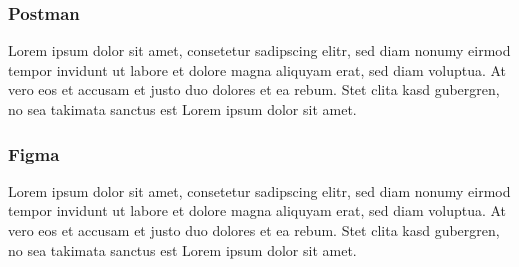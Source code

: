 \subsubsection{Postman}
Lorem ipsum dolor sit amet, consetetur sadipscing elitr, sed diam nonumy eirmod tempor invidunt ut labore et dolore magna aliquyam erat, sed diam voluptua. At vero eos et accusam et justo duo dolores et ea rebum. Stet clita kasd gubergren, no sea takimata sanctus est Lorem ipsum dolor sit amet.

\subsubsection{Figma}
Lorem ipsum dolor sit amet, consetetur sadipscing elitr, sed diam nonumy eirmod tempor invidunt ut labore et dolore magna aliquyam erat, sed diam voluptua. At vero eos et accusam et justo duo dolores et ea rebum. Stet clita kasd gubergren, no sea takimata sanctus est Lorem ipsum dolor sit amet.


